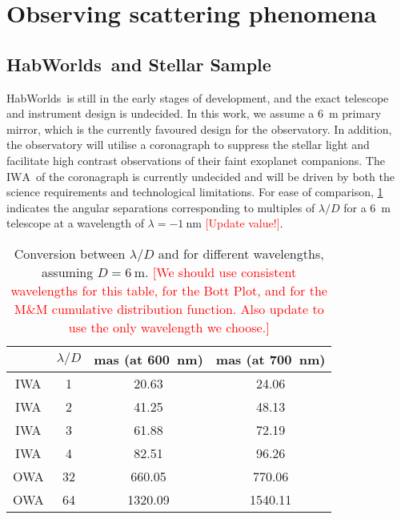 \documentclass[
    usenatbib,
]{mnras}
\newcommand{\todo}[1]{\textcolor{red}{[#1]}}
\newcommand{\IWA}{\ensuremath{\mathrm{IWA}}}
\newcommand{\hwo}{HabWorlds}
\begin{document}

\section{Observing scattering phenomena}


\subsection{\hwo\ and Stellar Sample}
\hwo\ is still in the early stages of development, and the exact telescope and instrument design is undecided. 
%
In this work, we assume a \SI{6}{\meter} primary mirror, which is the currently favoured design for the observatory.
%
In addition, the observatory will utilise a coronagraph to suppress the stellar light and facilitate high contrast observations of their faint exoplanet companions. 
%
The \IWA\ of the coronagraph is currently undecided and will be driven by both the science requirements and technological limitations. 
For ease of comparison, \cref{tab:IWA_OWA} indicates the angular separations corresponding to multiples of $\lambda / D$ for a \SI{6}{\meter} telescope at a wavelength of $\lambda = \SI{-1}{\nano\meter}$ \todo{Update value!}.

\begin{table}
    \centering
    \caption{
        Conversion between $\lambda / D$ and \si{\mas} for different wavelengths, assuming $D = \SI{6}{\meter}$. 
        \todo{We should use consistent wavelengths for this table, for the Bott Plot, and for the M\&M cumulative distribution function. Also update to use the only wavelength we choose.}
    }
    \label{tab:IWA_OWA}
    \begin{tabular}{ c c c c } 
    \toprule
     & $\lambda/D$ & mas (at \SI{600}{\nano\meter}) & mas (at \SI{700}{\nano\meter}) \\
    \midrule
    \midrule
    IWA & 1 & 20.63 & 24.06 \\
    IWA & 2 & 41.25 & 48.13 \\
    IWA & 3 & 61.88 & 72.19 \\
    IWA & 4 & 82.51 & 96.26 \\
    \midrule
    OWA & 32 &  660.05 & 770.06 \\
    OWA & 64 & 1320.09 & 1540.11 \\
    \bottomrule
    \end{tabular}
\end{table}
\end{document}
